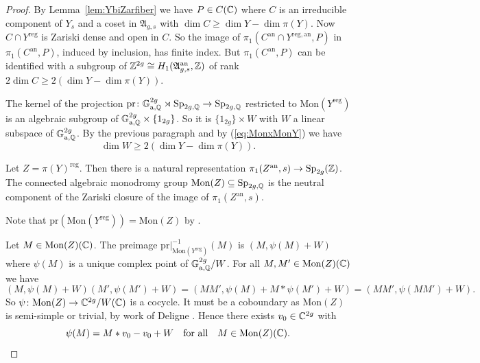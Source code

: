 \documentclass[12pt,oneside]{amsart}
\begin{document}
\begin{proof}
  By Lemma~\ref{lem:YbiZarfiber} 
  we have $P\in C({\mathbb{C}})$ where $C$ is an irreducible component of  
  $ Y_s$ and  a coset in $\mathfrak{A}_{g,s}$ with $\dim C\ge \dim Y -
  \dim\pi(Y)$. Now $C\cap Y^{\mathrm{reg}}$ is Zariski dense and open
  in $C$. So the image of  $\pi_1(C^{\mathrm{an}}\cap Y^{\mathrm{reg,an}},P)$ in
  $\pi_1(C^{\mathrm{an}},P)$, induced
  by inclusion, has
  finite index. But
  $\pi_1(C^{\mathrm{an}},P)$  can be identified with a
  subgroup of ${\mathbb{Z}}^{2g}\cong H_1(\mathfrak{A}_{g,s}^{\mathrm{an}},{\mathbb{Z}})$ of rank $2\dim C\ge 2 (\dim Y-\dim\pi(Y))$.   


  The kernel of the  projection
  $\mathrm{pr}\colon {\mathbb{G}}_{\mathrm{a},{\mathbb{Q}}}^{2g}\rtimes \mathrm{Sp}_{2g,{\mathbb{Q}}}\rightarrow
  \mathrm{Sp}_{2g,{\mathbb{Q}}}$
  restricted to 
  $\mathrm{Mon}(Y^{\mathrm{reg}})$
  is an algebraic subgroup of  ${\mathbb{G}}_{\mathrm{a},{\mathbb{Q}}}^{2g}\times \{1_{2g}\}$. So it is
  $\{1_{2g}\}\times W$ with $W$ a linear subspace of ${\mathbb{G}}_{\mathrm{a},{\mathbb{Q}}}^{2g}$. By
  the previous paragraph and by (\ref{eq:MonxMonY}) we have
  \begin{equation}
    \label{eq:dimWlb}
    \dim W \ge 2 (\dim Y - \dim\pi(Y)).
  \end{equation}


  Let $Z = \pi(Y)^{\mathrm{reg}}$.
  Then there is a natural representation 
  $\pi_1(Z^{\mathrm{an}},s)\rightarrow\mathrm{Sp}_{2g}({\mathbb{Z}})$.
  The connected algebraic monodromy group  $\mathrm{Mon}(Z)\subseteq\mathrm{Sp}_{2g,{\mathbb{Q}}}$ is
  the neutral component of the Zariski closure of the image
  of $\pi_1(Z^{\mathrm{an}},s)$.

  Note that $\mathrm{pr}(\mathrm{Mon}(Y^{\mathrm{reg}})) =
  \mathrm{Mon}(Z)$  by \cite[Lemme
  4.4.17]{Deligne:Hodge2}.

  
  Let $M \in \mathrm{Mon}(Z)({\mathbb{C}})$.
  The preimage $\mathrm{pr}|_{\mathrm{Mon}(Y^{\mathrm{reg}})}^{-1}(M)$ is $(M,\psi(M)+W)$ where $\psi(M)$
  is a unique complex point of
  ${\mathbb{G}}_{\mathrm{a},{\mathbb{Q}}}^{2g}/W$.  
  For all $M,M'\in \mathrm{Mon}(Z)({\mathbb{C}})$ we have
  \begin{equation*}
    (M,\psi(M)+W)(M',\psi(M')+W) =
    (MM',\psi(M)+M*\psi(M')+W) = (MM',\psi(MM')+W).
  \end{equation*}
  So $\psi \colon \mathrm{Mon}(Z)\rightarrow{\mathbb{C}}^{2g}/W({\mathbb{C}})$ is a cocycle.
  It must be a coboundary as $\mathrm{Mon}(Z)$ is semi-simple or trivial,
  by work of Deligne
  \cite[Corollaire~4.2.9(a)]{Deligne:Hodge2}.
  Hence there exists 
  $v_0\in {\mathbb{C}}^{2g}$ with
  \begin{equation*}
    \psi(M) = M*v_0-v_0+W\quad\text{for all}\quad M\in \mathrm{Mon}(Z)({\mathbb{C}}).    
  \end{equation*}


\end{proof}
\end{document}
